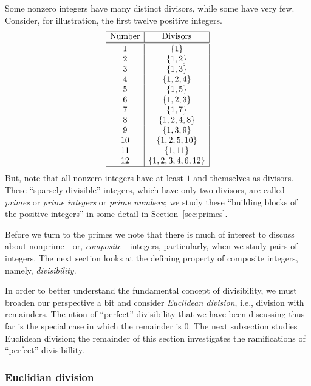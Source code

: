 Some nonzero integers have many distinct divisors, while some have
very few.  Consider, for illustration, the first twelve positive
integers.
\[ \begin{array}{|c|c|}
\hline
\mbox{Number} & \mbox{Divisors} \\
\hline
\hline
1  &  \{ 1 \} \\
2  &  \{ 1, 2 \} \\
3  &  \{ 1, 3 \} \\
4  &  \{ 1, 2, 4 \} \\
5  &  \{ 1, 5 \} \\
6  &  \{ 1, 2, 3 \} \\
7  &  \{ 1, 7 \} \\
8  &  \{ 1, 2, 4, 8 \} \\
9  &  \{ 1, 3, 9 \} \\
10  & \{ 1, 2, 5, 10 \} \\
11  & \{ 1, 11 \} \\
12  & \{ 1, 2, 3, 4, 6, 12 \} \\
\hline
\end{array}
\]
But, note that all nonzero integers have at least $1$ and themselves
as divisors.  These ``sparsely divisible'' integers, which have only
two divisors, are called {\it primes}
or {\it prime integers} or {\it prime numbers}; we study these
``building blocks of the positive integers'' in some detail in
Section~\ref{sec:primes}.

Before we turn to the primes we note that there is much of interest to
discuss about  nonprime---or, {\it
  composite}---integers, particularly, when we study pairs of
integers.  The next section looks at the defining property of
composite integers, namely, {\em divisibility}.

In order to better understand the fundamental concept of divisibility,
we must broaden our perspective a bit and consider {\em Euclidean
  division},  i.e., division with
remainders.  The ntion of ``perfect'' divisibility that we have been
discussing thus far is the special case in which the remainder is $0$.
The next subsection studies Euclidean division; the remainder of this
section investigates the ramifications of ``perfect'' divisibillity.

\subsubsection{Euclidian division}
\label{sec:euclidian}

